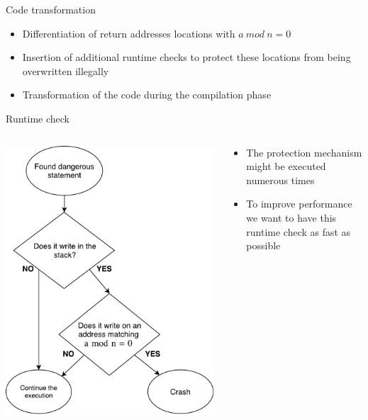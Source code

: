 \documentclass{beamer}
\begin{document}
\begin{frame}[c]{Code transformation}
	\begin{itemize}\itemsep20pt
		\item Differentiation of return addresses locations with $a~mod~n=0$
		\item Insertion of additional runtime checks to protect these locations from being overwritten illegally
		\item Transformation of the code during the compilation phase
	\end{itemize}
\end{frame}

\begin{frame}[c]{Runtime check}
	\begin{columns}
		\begin{column}{0.5\textwidth}
   			\includegraphics[height=0.85\textheight]{images/runtime_check.pdf}
		\end{column}
		\begin{column}{0.5\textwidth}
			\begin{itemize}\itemsep20pt
				\item The protection mechanism might be executed numerous times
				\item To improve performance we want to have this runtime check as fast as possible
			\end{itemize}
		\end{column}
	\end{columns}
\end{frame}
\end{document}
